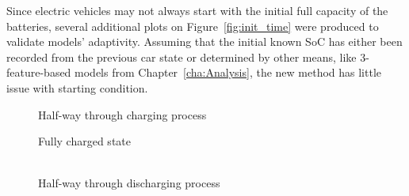 {    
Since electric vehicles may not always start with the initial full capacity of the batteries, several additional plots on Figure~\ref{fig:init_time} were produced to validate models' adaptivity.
Assuming that the initial known SoC has either been recorded from the previous car state or determined by other means, like 3-feature-based models from Chapter~\ref{cha:Analysis}, the new method has little issue with starting condition.
\begin{figure*}[htbp]
    \centering
    \begin{subfigure}[b]{0.325\textwidth}
        \centering
        
        \caption{Half-way through charging process}
    \end{subfigure}
    \hfill
    \begin{subfigure}[b]{0.325\textwidth}
        \centering
        
        \caption{Fully charged state \\ \ \ \ }
    \end{subfigure}
    \hfill
    \begin{subfigure}[b]{0.325\textwidth}
        \centering
        
        \caption{Half-way through discharging process}
    \end{subfigure}
    \caption{Different initial periods of model validation}
    \label{fig:init_time}
\end{figure*}
} { }
